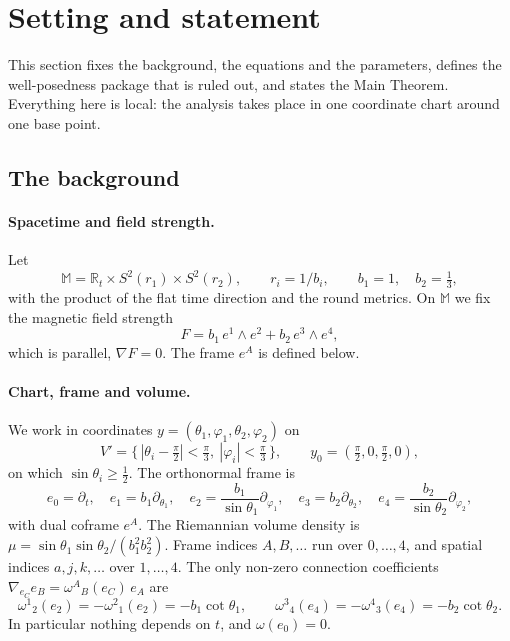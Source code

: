\documentclass[11pt]{article}
\theoremstyle{plain}
\theoremstyle{definition}
\theoremstyle{remark}
\newcommand{\R}{\mathbb{R}}
\newcommand{\M}{\mathbb{M}}
\begin{document}
\section{Setting and statement}\label{sec:setting}

This section fixes the background, the equations and the parameters, defines the well-posedness package that is ruled out, and states the Main Theorem. Everything here is local: the analysis takes place in one coordinate chart around one base point.

\subsection{The background}\label{sec:background}

\paragraph{Spacetime and field strength.}
Let
\[
  \M = \R_t \times S^2(r_1) \times S^2(r_2), \qquad r_i = 1/b_i,\qquad b_1 = 1,\quad b_2 = \tfrac13 ,
\]
with the product of the flat time direction and the round metrics. On $\M$ we fix the magnetic field strength
\[
  F = b_1\, e^1\wedge e^2 + b_2\, e^3\wedge e^4 ,
\]
which is parallel, $\nabla F = 0$. The frame $e^A$ is defined below.

\paragraph{Chart, frame and volume.}
We work in coordinates $y = (\theta_1,\varphi_1,\theta_2,\varphi_2)$ on
\[
  V' = \bigl\{\, |\theta_i - \tfrac{\pi}{2}| < \tfrac{\pi}{3},\ |\varphi_i| < \tfrac{\pi}{3} \,\bigr\},
  \qquad y_0 = (\tfrac{\pi}{2},0,\tfrac{\pi}{2},0),
\]
on which $\sin\theta_i \ge \tfrac12$. The orthonormal frame is
\[
  e_0 = \partial_t,\quad
  e_1 = b_1\partial_{\theta_1},\quad
  e_2 = \frac{b_1}{\sin\theta_1}\partial_{\varphi_1},\quad
  e_3 = b_2\partial_{\theta_2},\quad
  e_4 = \frac{b_2}{\sin\theta_2}\partial_{\varphi_2},
\]
with dual coframe $e^A$. The Riemannian volume density is $\mu = \sin\theta_1\sin\theta_2/(b_1^2 b_2^2)$. Frame indices $A,B,\dots$ run over $0,\dots,4$, and spatial indices $a,j,k,\dots$ over $1,\dots,4$. The only non-zero connection coefficients $\nabla_{e_C}e_B = \omega^{A}{}_{B}(e_C)\,e_A$ are
\[
  \omega^{1}{}_{2}(e_2) = -\omega^{2}{}_{1}(e_2) = -b_1\cot\theta_1,\qquad
  \omega^{3}{}_{4}(e_4) = -\omega^{4}{}_{3}(e_4) = -b_2\cot\theta_2 .
\]
In particular nothing depends on $t$, and $\omega(e_0) = 0$.
\end{document}

